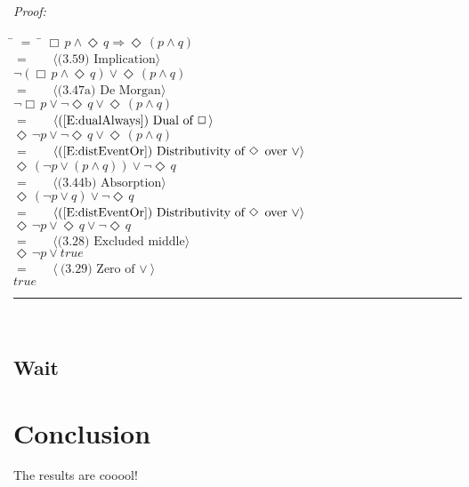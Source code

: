 \documentclass[fleqn, leqno]{article}
\newcommand{\lgap}{2pt}                             %
\newcommand{\mymathindent}{24pt}                    %
\newcommand{\Event}{\Diamond\,}
\newcommand{\Always}{\Box\,}
\newcommand{\myqed}{\hfill\rule[-.23ex]{1.2ex}{2.0ex}}
\newcommand{\Gll} {\langle}                         %
\newcommand{\Ggg} {\rangle}                         %
\newcommand{\Hint}[1]     {\ \ \ $\Gll              \mbox{#1} \Ggg$ }   %
\begin{document}
\emph{Proof:}
\begin{tabbing}
\hspace{\mymathindent} \= $= \;$ \= \kill
  \> \>   $\Always p \land \Event q \Rightarrow \Event (p \land q)$\\[\lgap]
  \> $=$  \>  \Hint{(3.59) Implication}\\[\lgap]
  \> \>   $\lnot(\Always p \land \Event q) \lor \Event(p \land q)$\\[\lgap]
  \> $=$  \>  \Hint{(3.47a) De Morgan}\\[\lgap]
  \> \>   $\lnot\Always p \lor \lnot\Event q \lor \Event(p \land q)$\\[\lgap]
  \> $=$  \>  \Hint{(\ref{E:dualAlways}) Dual of $\Always$}\\[\lgap]
  \> \>   $\Event\lnot p \lor \lnot\Event q \lor \Event(p \land q)$\\[\lgap]
  \> $=$  \>  \Hint{(\ref{E:distEventOr}) Distributivity of $\Event$ over $\lor$}\\[\lgap]
  \> \>   $\Event(\lnot p \lor (p \land q)) \lor \lnot\Event q$\\[\lgap]
  \> $=$  \>  \Hint{(3.44b) Absorption}\\[\lgap]
  \> \>   $\Event(\lnot p \lor q) \lor \lnot\Event q$\\[\lgap]
  \> $=$  \>  \Hint{(\ref{E:distEventOr}) Distributivity of $\Event$ over $\lor$}\\[\lgap]
  \> \>   $\Event\lnot p \lor \Event q \lor \lnot\Event q$\\[\lgap]
  \> $=$  \>  \Hint{(3.28) Excluded middle}\\[\lgap]
  \> \>   $\Event\lnot p \lor true$\\[\lgap]
  \> $=$  \>  \Hint{(3.29) Zero of $\lor$}\\[\lgap]
  \> \>   $true$\\[\lgap]
\end{tabbing}
\myqed\\[\lgap]

\subsection{Wait}

\section{Conclusion}

The results are cooool!\\



\end{document}
